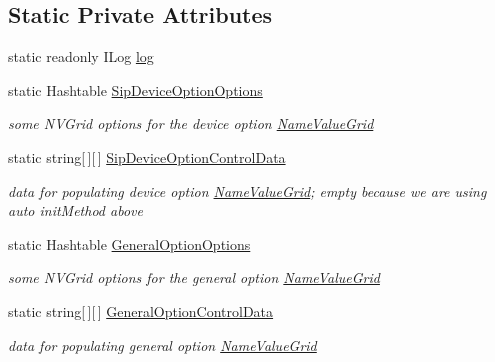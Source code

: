 \subsection*{Static Private Attributes}
\begin{DoxyCompactItemize}
\item 
static readonly ILog \hyperlink{class_ias_pbx_config_1_1_trunk_details_ae08deb88359e29b30255750ee33072a3}{log}
\item 
static Hashtable \hyperlink{class_ias_pbx_config_1_1_trunk_details_a0647e696eac396ee74192f30deee4709}{SipDeviceOptionOptions}
\begin{DoxyCompactList}\small\item\em some NVGrid options for the device option \hyperlink{class_ias_pbx_config_1_1_name_value_grid}{NameValueGrid} \item\end{DoxyCompactList}\item 
static string\mbox{[}$\,$\mbox{]}\mbox{[}$\,$\mbox{]} \hyperlink{class_ias_pbx_config_1_1_trunk_details_a63923565253ba942384b5e2bb38a3df7}{SipDeviceOptionControlData}
\begin{DoxyCompactList}\small\item\em data for populating device option \hyperlink{class_ias_pbx_config_1_1_name_value_grid}{NameValueGrid}; empty because we are using auto initMethod above \item\end{DoxyCompactList}\item 
static Hashtable \hyperlink{class_ias_pbx_config_1_1_trunk_details_a626346e22ccfb014143c37c2dde77fd3}{GeneralOptionOptions}
\begin{DoxyCompactList}\small\item\em some NVGrid options for the general option \hyperlink{class_ias_pbx_config_1_1_name_value_grid}{NameValueGrid} \item\end{DoxyCompactList}\item 
static string\mbox{[}$\,$\mbox{]}\mbox{[}$\,$\mbox{]} \hyperlink{class_ias_pbx_config_1_1_trunk_details_a866767d2389bed7020f9f50ffcab120b}{GeneralOptionControlData}
\begin{DoxyCompactList}\small\item\em data for populating general option \hyperlink{class_ias_pbx_config_1_1_name_value_grid}{NameValueGrid} \item\end{DoxyCompactList}\end{DoxyCompactItemize}


